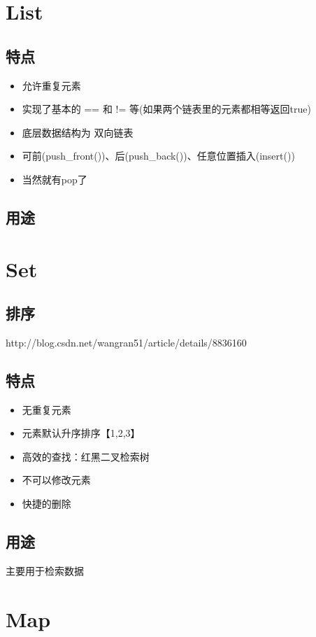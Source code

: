 \documentclass[UTF8,a4paper,12pt]{ctexbook}
\begin{document}
\section{List}
	\subsection{特点}
		\begin{itemize}
			\item 允许重复元素
			\item 实现了基本的 == 和 != 等(如果两个链表里的元素都相等返回true)
			\item 底层数据结构为 双向链表
			\item 可前(push\_front())、后(push\_back())、任意位置插入(insert())
			\item 当然就有pop了
		\end{itemize}
	\subsection{用途}
		
\newpage
\section{Set }
	\subsection{排序}http://blog.csdn.net/wangran51/article/details/8836160
	
	\subsection{特点}
		\begin{itemize}
			\item 无重复元素
			\item 元素默认升序排序【1,2,3】
			\item 高效的查找：红黑二叉检索树
			\item 不可以修改元素
			\item 快捷的删除
		\end{itemize}
	\subsection{用途}
		主要用于检索数据



\newpage
\section{Map}	
\end{document}
